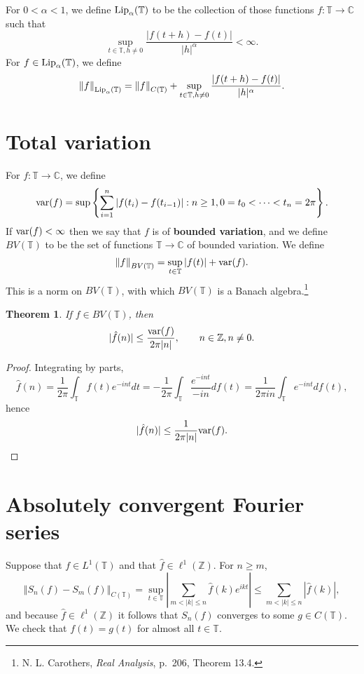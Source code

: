 \documentclass{article}
\newcommand{\var}{\ensuremath\mathrm{var}}
\newcommand{\Lip}{\ensuremath\mathrm{Lip}}
\newcommand{\norm}[1]{\left\Vert #1 \right\Vert}
\newtheorem{theorem}{Theorem}
\theoremstyle{definition}
\begin{document}
For $0<\alpha<1$, we define $\Lip_\alpha(\mathbb{T})$ to be the collection of those functions
$f:\mathbb{T} \to \mathbb{C}$ such that
\[
\sup_{t \in \mathbb{T}, h \neq 0} \frac{|f(t+h)-f(t)|}{|h|^\alpha}<\infty.
\] 
For $f \in \Lip_\alpha(\mathbb{T})$, we define
\[
\norm{f}_{\Lip_\alpha(\mathbb{T})} = \norm{f}_{C(\mathbb{T})}+
\sup_{t \in \mathbb{T}, h \neq 0} \frac{|f(t+h)-f(t)|}{|h|^\alpha}.
\]



\section{Total variation}
For $f:\mathbb{T} \to \mathbb{C}$, we define
\[
\var(f) = \sup \left\{ \sum_{i=1}^n |f(t_i)-f(t_{i-1})|:
n \geq 1, 0=t_0<\cdots<t_n=2\pi \right\}.
\]
If $\var(f)<\infty$ then we say that $f$ is of \textbf{bounded variation}, and we define $BV(\mathbb{T})$ to be the set of functions
$\mathbb{T} \to \mathbb{C}$ of bounded variation. We define
\[
\norm{f}_{BV(\mathbb{T})} =\sup_{t \in \mathbb{T}} |f(t)|+\var(f).
\]
This is a norm on $BV(\mathbb{T})$, with which $BV(\mathbb{T})$ is a Banach algebra.\footnote{N. L. Carothers, {\em Real Analysis},
p.~206, Theorem 13.4.}

\begin{theorem}
If $f \in BV(\mathbb{T})$, then 
\[
|\hat{f}(n)| \leq \frac{\var(f)}{2\pi|n|}, \qquad n \in \mathbb{Z}, n \neq 0.
\]
\end{theorem}
\begin{proof}
Integrating by parts,
\[
\hat{f}(n)=\frac{1}{2\pi} \int_{\mathbb{T}} f(t) e^{-int} dt
=- \frac{1}{2\pi} \int_{\mathbb{T}} \frac{e^{-int}}{-in} df(t)
=\frac{1}{2\pi in} \int_{\mathbb{T}} e^{-int} df(t),
\]
hence
\[
|\hat{f}(n)| \leq \frac{1}{2\pi |n|} \var(f).
\]
\end{proof}


\section{Absolutely convergent Fourier series}
Suppose that $f \in L^1(\mathbb{T})$ and that $\hat{f} \in \ell^1(\mathbb{Z})$.
For $n \geq m$,
\[
\norm{S_n(f)-S_m(f)}_{C(\mathbb{T})} = 
\sup_{t \in \mathbb{T}} \left| \sum_{m < |k| \leq n} \hat{f}(k) e^{ikt} \right|
\leq \sum_{m < |k| \leq n} |\hat{f}(k)|,
\]
and because $\hat{f} \in \ell^1(\mathbb{Z})$ it follows that $S_n(f)$ converges to some 
$g \in C(\mathbb{T})$.
We check that $f(t)=g(t)$ for almost all $t \in \mathbb{T}$.
\end{document}

